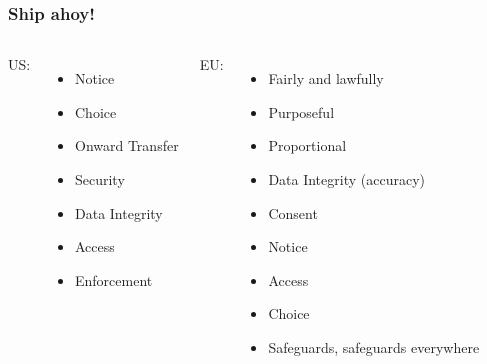 \documentclass{beamer}
\begin{document}
\begin{frame}
    \frametitle{Ship ahoy!}
    \begin{columns}[t]
        US:
        \begin{itemize}
            \item Notice
            \item Choice
            \item Onward Transfer
            \item Security
            \item Data Integrity
            \item Access
            \item Enforcement
        \end{itemize}
        EU:
        \begin{itemize}
            \item Fairly and lawfully
            \item Purposeful
            \item Proportional
            \item Data Integrity (accuracy)
            \item Consent
            \item Notice
            \item Access
            \item Choice
            \item Safeguards, safeguards everywhere
        \end{itemize}
    \end{columns}
\end{frame}
\end{document}
